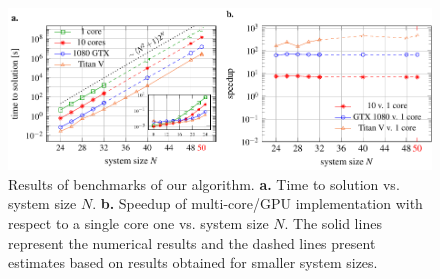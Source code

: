 \begin{figure}
  \centering
  \includegraphics[width=\textwidth]{figures/resultsplot_reduced.pdf}
  \caption{Results of benchmarks of our algorithm. {\textbf{a.}} Time to solution vs. system size $N$. {\textbf{b.}} Speedup of multi-core/GPU implementation with respect to a single core one vs. system size $N$. The solid lines represent the numerical results and the dashed lines present estimates based on results obtained for smaller system sizes.}
  \label{fig:benchmark_results}
\end{figure}
